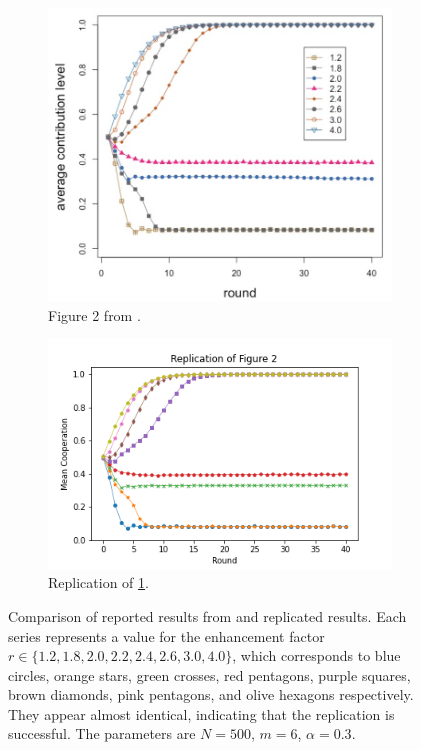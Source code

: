 \FloatBarrier 
\begin{figure}[!h]
  \begin{subfigure}[b]{0.45\textwidth}
    \includegraphics[width=\textwidth]{images/TAfig2_real.png}
    \caption{Figure 2 from \cite{RN49}. }
    \label{TAfig2_real}
  \end{subfigure}
  \hfill
  \begin{subfigure}[b]{0.45\textwidth}
    \includegraphics[width=1.25\textwidth]{images/TAfig2.png}
    \caption{Replication of \ref{TAfig2_real}. }
    \label{TAfig2}
  \end{subfigure}
  \caption{Comparison of reported results from \cite{RN49} and replicated results. Each series represents a value for the enhancement factor $r \in \{1.2, 1.8, 2.0, 2.2, 2.4, 2.6, 3.0, 4.0\}$, which corresponds to blue circles, orange stars, green crosses, red pentagons, purple squares, brown diamonds, pink pentagons, and olive hexagons respectively. They appear almost identical, indicating that the replication is successful. The parameters are $N=500$, $m=6$, $\alpha = 0.3$.} \label{comp0}
\end{figure} 
\FloatBarrier

